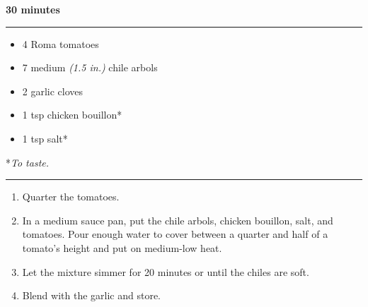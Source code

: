  \hfill {\large \textbf{30 minutes}}

\vspace{15pt} \hrule \vspace{15pt}
\begin{itemize}
	\item 4 Roma tomatoes
	\item 7 medium \textit{(1.5 in.)} chile arbols
	\item 2 garlic cloves
	\item 1 tsp chicken bouillon*
	\item 1 tsp salt*
\end{itemize}
\begin{flushright} \small{*\textit{To taste.}}\end{flushright}

\vspace{15pt} \hrule \vspace{15pt}
\begin{enumerate}
	\item Quarter the tomatoes.
	\item In a medium sauce pan, put the chile arbols, chicken bouillon, salt, and tomatoes. Pour enough water to cover between a quarter and half of a tomato's height and put on medium-low heat.
	\item Let the mixture simmer for 20 minutes or until the chiles are soft.
	\item Blend with the garlic and store.
\end{enumerate}
